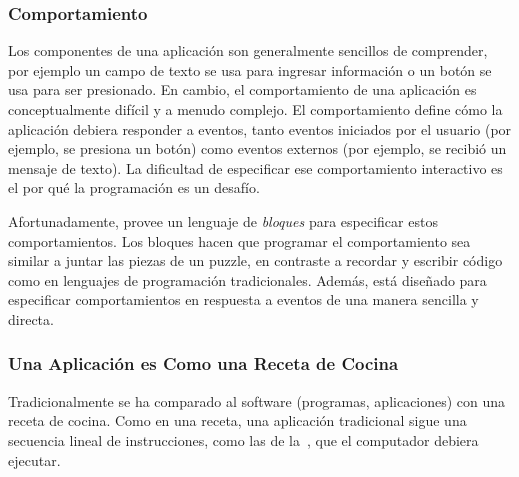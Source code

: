 \documentclass[letterpaper]{article}
\begin{document}
\subsubsection*{Comportamiento}

Los componentes de una aplicación son generalmente sencillos de
comprender, por ejemplo un campo de texto se usa para ingresar
información o un botón se usa para ser presionado. En cambio, el
comportamiento de una aplicación es conceptualmente difícil y a menudo
complejo. El comportamiento define cómo la aplicación debiera
responder a eventos, tanto eventos iniciados por el usuario (por
ejemplo, se presiona un botón) como eventos externos (por ejemplo, se
recibió un mensaje de texto). La dificultad de especificar ese
comportamiento interactivo es el por qué la programación es un
desafío.

Afortunadamente, \AppInventor provee un lenguaje de \emph{bloques}
para especificar estos comportamientos. Los bloques hacen que
programar el comportamiento sea similar a juntar las piezas de un
puzzle, en contraste a recordar y escribir código como en lenguajes de
programación tradicionales. Además, \AppInventor está diseñado para
especificar comportamientos en respuesta a eventos de una manera
sencilla y directa.

\subsubsection*{Una Aplicación es Como una Receta de Cocina}

Tradicionalmente se ha comparado al software (programas, aplicaciones)
con una receta de cocina. Como en una receta, una aplicación
tradicional sigue una secuencia lineal de instrucciones, como las de
la~, que el computador debiera ejecutar.
\end{document}

